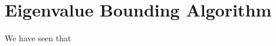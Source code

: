\documentclass[]{IEEEtran}
\theoremstyle{definition}
\theoremstyle{remark}
\newcommand{\MC}[1]{\mathcal{#1}}
\DeclareMathOperator{\diag}{diag}
\begin{document}
\section{Eigenvalue Bounding Algorithm}

We have seen that 
















\end{document}
